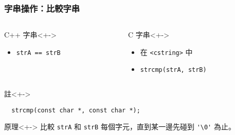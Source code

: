 \documentclass[utf8]{beamer}
\begin{document}
\begin{CJK}{UTF8}{bkai}
\begin{frame}[fragile]
  \frametitle{字串操作：比較字串}
  \begin{columns}[T]
    \begin{column}[T]{5.5cm}
    \begin{block}{C++ 字串}<+->
      \begin{itemize}
      \item \lstinline{strA == strB}{}
      \end{itemize}
    \end{block}
    \end{column}
    \begin{column}[T]{5.5cm}
    \begin{block}{C 字串}<+->
      \begin{itemize}[<+->]
      \item 在 \lstinline{<cstring>}{} 中
      \item \lstinline{strcmp(strA, strB)}{}
      \end{itemize}
    \end{block}
    \end{column}
  \end{columns}
  \begin{alertblock}{註}<+->
    \begin{lstlisting}
  strcmp(const char *, const char *);
    \end{lstlisting}
  \end{alertblock}
  \begin{exampleblock}{原理}<+->
  比較 \lstinline{strA}{} 和 \lstinline{strB}{} 每個字元，直到某一邊先\alert{碰到} \lstinline{'\0'}{} 為止。
  \end{exampleblock}
\end{frame}


\end{CJK}
\end{document}
